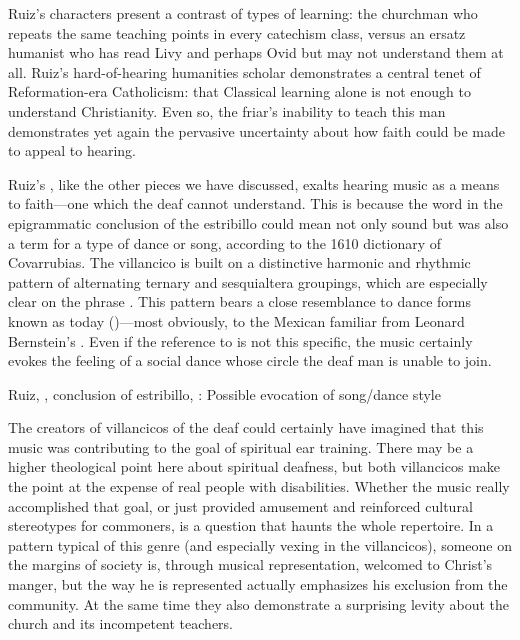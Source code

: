 Ruiz's characters present a contrast of types of learning: the churchman who repeats the same teaching points in every catechism class, versus an ersatz humanist who has read Livy and perhaps Ovid but may not understand them at all.
Ruiz's hard-of-hearing humanities scholar demonstrates a central tenet of Reformation-era Catholicism: that Classical learning alone is not enough to understand Christianity.
Even so, the friar's inability to teach this man demonstrates yet again the pervasive uncertainty about how faith could be made to appeal to hearing.

Ruiz's , like the other pieces we have discussed, exalts hearing music as a means to faith---one which the deaf cannot understand.
This is because the word  in the epigrammatic conclusion of the estribillo could mean not only sound but was also a term for a type of dance or song, according to the 1610 dictionary of Covarrubias.
The villancico is built on a distinctive harmonic and rhythmic pattern of alternating ternary and sesquialtera groupings, which are especially clear on the phrase .
This pattern bears a close resemblance to dance forms known as  today ()---most obviously, to the Mexican  familiar from Leonard Bernstein's .
Even if the reference to  is not this specific, the music certainly evokes the feeling of a social dance whose circle the deaf man is unable to join.


\begin{exmusic}
  \caption{Ruiz, , conclusion of estribillo, : Possible evocation of  song/dance style}
  \label{exmusic:Ruiz-Sordos-son}
\end{exmusic}

The creators of villancicos of the deaf could certainly have imagined that this music was contributing to the goal of spiritual ear training.
There may be a higher theological point here about spiritual deafness, but both  villancicos make the point at the expense of real people with disabilities.
Whether the music really accomplished that goal, or just provided amusement and reinforced cultural stereotypes for commoners, is a question that haunts the whole repertoire.
In a pattern typical of this genre (and especially vexing in the  villancicos), someone on the margins of society is, through musical representation, welcomed to Christ's manger, but the way he is represented actually emphasizes his exclusion from the community.
At the same time they also demonstrate a surprising levity about the church and its incompetent teachers.


